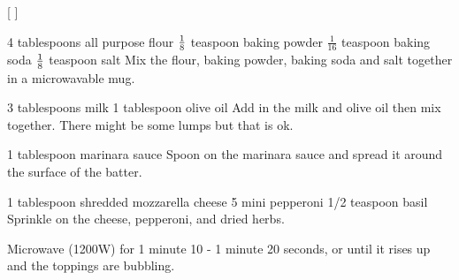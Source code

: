 
[
]

\begin{step}
4 tablespoons all purpose flour
$\frac{1}{8}$ teaspoon baking powder
$\frac{1}{16}$ teaspoon baking soda
$\frac{1}{8}$ teaspoon salt
\method
Mix the flour, baking powder, baking soda and salt together in a microwavable mug.
\end{step}

\begin{step}
3 tablespoons milk
1 tablespoon olive oil
\method
Add in the milk and olive oil then mix together. There might be some lumps but that is ok.
\end{step}

\begin{step}
1 tablespoon marinara sauce
\method
Spoon on the marinara sauce and spread it around the surface of the batter.
\end{step}

\begin{step}
1 tablespoon shredded mozzarella cheese
5 mini pepperoni
1/2 teaspoon basil
\method
Sprinkle on the cheese, pepperoni, and dried herbs.

Microwave (1200W) for 1 minute 10 - 1 minute 20 seconds, or until it rises up and the toppings are bubbling.
\end{step}